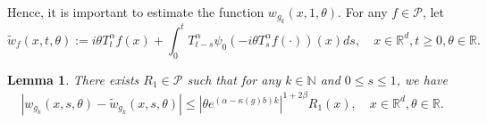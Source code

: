 \documentclass[12pt, a4paper]{amsart}
\newtheorem{lem}[thm]{Lemma}
\theoremstyle{definition}
\numberwithin{equation}{section}
\begin{document}
Hence, it is important to estimate the function $w_{g_k}(x,1,\theta)$. For any $f \in \mathcal{P}$, let
\begin{equation}\label{w2function}
    \tilde{w}_{f}(x,t,\theta)
    := i\theta T^{\alpha}_t f(x) + \int_0^t T^{\alpha}_{t-s}\psi_0(-i\theta T_s^{\alpha}f(\cdot))(x)ds,
    \quad x\in \mathbb R^d,t\geq 0, \theta \in \mathbb R.
\end{equation}

\begin{lem}\label{lemma2}
There exists $R_1 \in \mathcal{P}$ such that for any $k \in \mathbb{N}$ and $0\leq s \leq 1$, we have
\begin{align}
    |w_{g_k}(x,s,\theta)-\tilde{w}_{g_k}(x,s,\theta)|
    \leq |\theta e^{(\alpha-\kappa(g)b)k}|^{1+2\beta}R_1(x),
    \quad x\in \mathbb{R}^d,\theta\in \mathbb{R}.
\end{align}

\end{lem}
\end{document}
